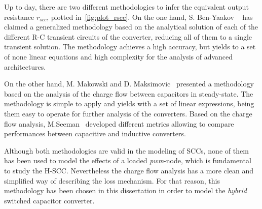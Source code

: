 Up to day, there are two different methodologies to infer the equivalent output resistance $r_{scc}$, plotted in~\ref{fig:plot_rscc}. On the one hand, S. Ben-Yaakov  ~\cite{2009Ben-Yaakov,2012Ben-Yaakov,2013Evzelman} has claimed a generalized methodology based on the analytical solution of each of the different R-C transient circuits of the converter, reducing all of them to a single transient solution. The methodology achieves a high accuracy, but yields to a set of none linear equations and high complexity for the analysis of advanced architectures.

On the other hand,  M. Makowski and D. Maksimovic~\cite{95Makowski} presented a methodology based on the analysis of the charge flow between capacitors in steady-state. The methodology is simple to apply and yields with a set of linear expressions, being them easy to operate for further analysis of the converters. Based on the charge flow analysis, M.Seeman~\cite{Seeman:EECS-2009-78} developed different metrics allowing to compare performances between capacitive and inductive converters.

Although both methodologies are valid in the modeling of SCCs, none of them has been used to model the effects of a loaded \emph{pwm}-node, which is fundamental to study the H-SCC.  Nevertheless the charge flow analysis has a more clean and simplified way of describing the loss mechanism. For that reason, this methodology has been chosen in this dissertation in order to model the \emph{hybrid} switched capacitor converter.

